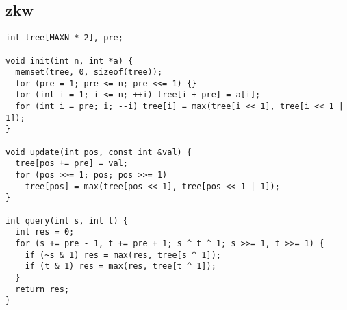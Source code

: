 \documentclass[twoside]{article}
\begin{document}
\subsection{zkw}
\begin{lstlisting}
int tree[MAXN * 2], pre;

void init(int n, int *a) {
  memset(tree, 0, sizeof(tree));
  for (pre = 1; pre <= n; pre <<= 1) {}
  for (int i = 1; i <= n; ++i) tree[i + pre] = a[i];
  for (int i = pre; i; --i) tree[i] = max(tree[i << 1], tree[i << 1 | 1]);
}

void update(int pos, const int &val) {
  tree[pos += pre] = val;
  for (pos >>= 1; pos; pos >>= 1)
    tree[pos] = max(tree[pos << 1], tree[pos << 1 | 1]);
}

int query(int s, int t) {
  int res = 0;
  for (s += pre - 1, t += pre + 1; s ^ t ^ 1; s >>= 1, t >>= 1) {
    if (~s & 1) res = max(res, tree[s ^ 1]);
    if (t & 1) res = max(res, tree[t ^ 1]);
  }
  return res;
}

\end{lstlisting}
\end{document}
